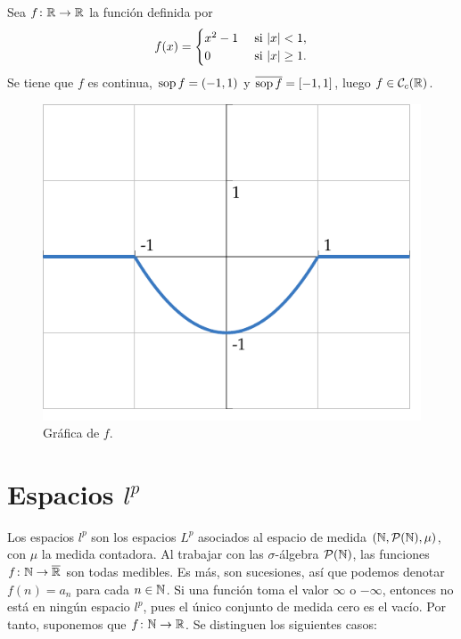 \documentclass[a4paper, 11pt, oneside]{report}
\begin{document}
\begin{example}
  Sea $f \colon \mathbb R \to \mathbb R$ la función definida por
  \[f(x) = \begin{cases}
    x^2 - 1 & $ si $ |x| < 1, \\
    0 & $ si $ |x| \geq 1.
  \end{cases}\]
  Se tiene que $f$ es continua, $\textup{sop}\, f = (-1,1)$ y $\overline{\textup{sop}\, f} = [-1,1]$, luego $f \in \mathcal{C}_c(\mathbb R)$.

  \begin{figure}[H]
    \centering
    \includegraphics{./plot3/main.pdf}
    \caption{Gráfica de $f$.}
  \end{figure}

\end{example}

\section[Espacios \texorpdfstring{$l^p$}{lp}]{Espacios \texorpdfstring{\boldmath$l^p$}{lp}}

Los espacios $l^p$ son los espacios $L^p$ asociados al espacio de medida $(\mathbb N, \mathcal{P}(\mathbb N),\mu)$, con $\mu$ la medida contadora. Al trabajar con las $\sigma$-álgebra $\mathcal{P}(\mathbb N)$, las funciones $f \colon \mathbb N \to \overline{\mathbb R}$ son todas medibles. Es más, son sucesiones, así que podemos denotar $f(n) = a_n$ para cada $n \in \mathbb N$. Si una función toma el valor $\infty$ o $-\infty$, entonces no está en ningún espacio $l^p$, pues el único conjunto de medida cero es el vacío. Por tanto, suponemos que $f \colon \mathbb N \to \mathbb R$. Se distinguen los siguientes casos:
\end{document}
